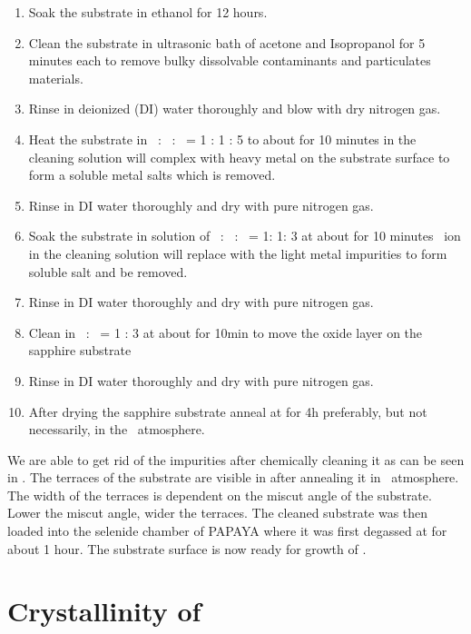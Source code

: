 \begin{enumerate}
    \item Soak the substrate in ethanol for 12 hours.
    \item Clean the substrate in ultrasonic bath of acetone and Isopropanol for 5 minutes each to remove 
    bulky dissolvable contaminants and particulates materials.
    \item Rinse in deionized (DI) water thoroughly and blow with dry nitrogen gas.
    \item Heat the substrate in \ammonia\ : \peroxide\ :  \water\ = 1 : 1 : 5 to about  for 10 minutes \ammoniumion in the 
    cleaning solution will complex with heavy metal on the substrate surface to form a soluble metal salts which is removed.
    \item Rinse in DI water thoroughly and dry with pure nitrogen gas.
    \item Soak the substrate in solution of \hcl\ : \peroxide\ : \water\ = 1: 1: 3 at about  for 10 minutes \hydrogenion\ ion 
    in the cleaning solution will replace with the light metal impurities to form soluble salt and be removed.
    \item Rinse in DI water thoroughly and dry with pure nitrogen gas.
    \item Clean in \sulphuricacid\ : \phosphoricacid\ = 1 : 3 at about  for 10min to move the oxide layer on the sapphire substrate
    \item Rinse in DI water thoroughly and dry with pure nitrogen gas.
    \item After drying the sapphire substrate anneal at  for 4h preferably, but not necessarily, in the \oxygen\ atmosphere.
\end{enumerate}



We are able to get rid of the impurities after chemically cleaning it as can be seen in .
The terraces of the substrate are visible in  after annealing it in \oxygen\ atmosphere.
The width of the terraces is dependent on the miscut angle of the substrate. Lower the miscut angle, 
wider the terraces. The cleaned substrate was then loaded into the selenide chamber of PAPAYA where 
it was first degassed at  for about 1 hour. The substrate surface is now ready for growth of \nbse. \\

\section{Crystallinity of \nbse}

